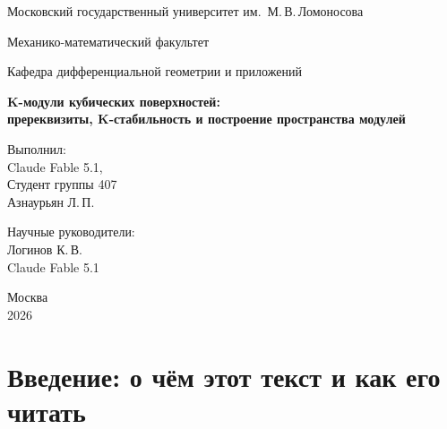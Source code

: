 \documentclass[11pt,a4paper]{article}
\theoremstyle{plain}
\theoremstyle{definition}
\theoremstyle{remark}
\begin{document}
\begin{titlepage}
	\begin{center}
		
		{\large Московский государственный университет им.\ М.\,В.\,Ломоносова}
		
		\vspace{0.5cm}
		
		{\large Механико-математический факультет}
		
		\vspace{0.5cm}
		
		{\large Кафедра дифференциальной геометрии и приложений}
		
		\vspace{3cm}
		
		{\LARGE \textbf{K-модули кубических поверхностей:\\[4pt] пререквизиты, K-стабильность и построение пространства модулей}}
		
		\vspace{0.5cm}
		
		
		\vfill
		
		\begin{flushright}
			Выполнил: \\
			Claude Fable 5.1,\\
			Студент группы 407 \\
			Азнаурьян Л.\,П. \\
			
			
			\vspace{1cm}
			
			Научные руководители: \\
			Логинов К.\,В.\\
			Claude Fable 5.1
		\end{flushright}
		
		\vfill
		
		Москва \\
		2026
		
	\end{center}
\end{titlepage}

\newpage

\tableofcontents
\newpage
{}

\setcounter{section}{-1}
\section{Введение: о чём этот текст и как его читать}\label{sec:intro}
\end{document}
